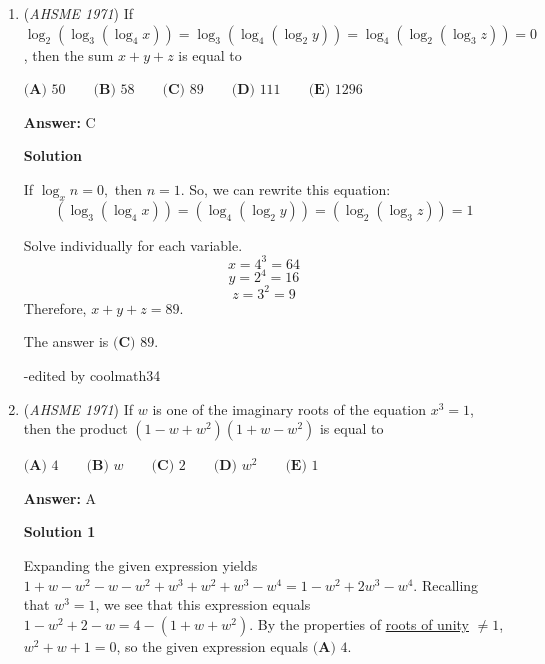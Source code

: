 \begin{enumerate}
\textbf{Solution 2}

The given equation can be rewritten as $x^2+2hx-3=0$. By \href{https://artofproblemsolving.com/wiki/index.php?title=Vieta\%27s\_Formulas}{Vieta's Formulas}, we know that the sum of the roots is $-2h$. Thus, by \href{https://artofproblemsolving.com/wiki/index.php?title=Newton\%27s\_Sums}{Newton's sums}, we have the following equation:\begin{align*}10+(2h)(-2h)+2(-3) &= 0 \\10-4h^2-6 &= 0 \\-4h^2 &= -4 \\h^2 &= 1 \\|h| &= 1 \\\end{align*}
Thus, our answer is $\boxed{\textbf{(E) }\text{None of these}}$.

 


	\item (\textit{AHSME 1971}) If $\log_2(\log_3(\log_4 x))=\log_3(\log_4(\log_2 y))=\log_4(\log_2(\log_3 z))=0$, then the sum $x+y+z$ is equal to


 $\textbf{(A) }50\qquad \textbf{(B) }58\qquad \textbf{(C) }89\qquad \textbf{(D) }111\qquad  \textbf{(E) }1296$

 \textbf{Answer: }C



\textbf{Solution}

If $\log_{x}{n}=0,$ then $n = 1.$ So, we can rewrite this equation:
 \[(\log_3(\log_4 x))=(\log_4(\log_2 y))=(\log_2(\log_3 z))=1\]

 Solve individually for each variable.
 \[x = 4^3 = 64\]
 \[y = 2^4 = 16\]
 \[z = 3^2 = 9\]Therefore, $x + y + z = 89.$

 The answer is $\boxed{\textbf{(C) }89}.$

 -edited by coolmath34

 


	\item (\textit{AHSME 1971}) If $w$ is one of the imaginary roots of the equation $x^3=1$, then the product $(1-w+w^2)(1+w-w^2)$ is equal to


 $\textbf{(A) }4\qquad \textbf{(B) }w\qquad \textbf{(C) }2\qquad \textbf{(D) }w^2\qquad  \textbf{(E) }1$

 \textbf{Answer: }A



\textbf{Solution 1}

Expanding the given expression yields $1+w-w^2-w-w^2+w^3+w^2+w^3-w^4=1-w^2+2w^3-w^4$. Recalling that $w^3=1$, we see that this expression equals $1-w^2+2-w=4-(1+w+w^2)$. By the properties of \href{https://artofproblemsolving.com/wiki/index.php?title=Roots\_of\_unity}{roots of unity} $\neq 1$, $w^2+w+1=0$, so the given expression equals $\boxed{\textbf{(A) }4}$.


\end{enumerate}
